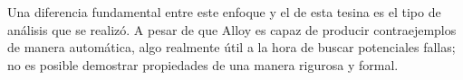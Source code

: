 Una diferencia fundamental entre este enfoque y el de esta tesina es el tipo de
análisis que se realizó. A pesar de que Alloy es capaz de producir
contraejemplos de manera automática, algo realmente útil a la hora de buscar
potenciales fallas; no es posible demostrar propiedades de una manera rigurosa y
formal.



